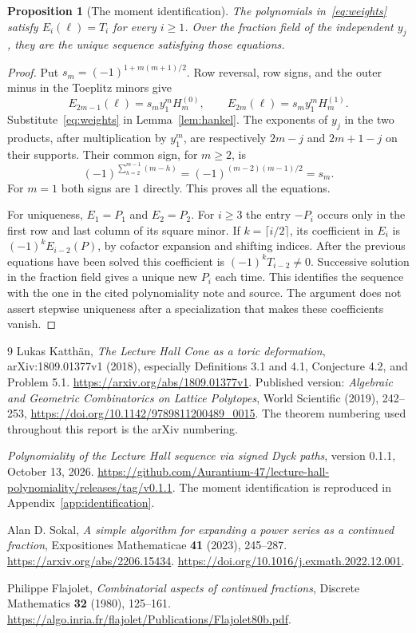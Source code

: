 \documentclass[11pt]{article}
\newtheorem{proposition}[theorem]{Proposition}
\theoremstyle{definition}
\theoremstyle{remark}
\begin{document}
\begin{proposition}[The moment identification]\label{prop:identification}
The polynomials in~\eqref{eq:weights} satisfy $E_i(\ell)=T_i$ for every
$i\ge1$. Over the fraction field of the independent $y_j$, they are the
unique sequence satisfying those equations.
\end{proposition}
\begin{proof}
Put $s_m=(-1)^{1+m(m+1)/2}$. Row reversal, row signs, and the outer minus
in the Toeplitz minors give
\[
 E_{2m-1}(\ell)=s_m y_1^mH_m^{(0)},\qquad
 E_{2m}(\ell)=s_m y_1^mH_m^{(1)}.
\]
Substitute~\eqref{eq:weights} in Lemma~\ref{lem:hankel}.
The exponents of $y_j$ in the two products, after multiplication by $y_1^m$,
are respectively $2m-j$ and $2m+1-j$ on their supports. Their common sign,
for $m\ge2$, is
\[
 (-1)^{\sum_{h=2}^{m-1}(m-h)}
 =(-1)^{(m-2)(m-1)/2}=s_m.
\]
For $m=1$ both signs are $1$ directly. This proves all the equations.

For uniqueness, $E_1=P_1$ and $E_2=P_2$. For $i\ge3$ the entry $-P_i$
occurs only in the first row and last column of its square minor. If
$k=\lceil i/2\rceil$, its coefficient in $E_i$ is
$(-1)^kE_{i-2}(P)$, by cofactor expansion and shifting indices.
After the previous equations have been solved this coefficient is
$(-1)^kT_{i-2}\ne0$. Successive solution in the fraction field gives a
unique new $P_i$ each time. This identifies the sequence with the one in
the cited polynomiality note and source. The argument does not assert stepwise uniqueness
after a specialization that makes these coefficients vanish.
\end{proof}

\begin{thebibliography}{9}
Lukas Katth\"an,
\emph{The Lecture Hall Cone as a toric deformation},
arXiv:1809.01377v1 (2018), especially Definitions 3.1 and 4.1,
Conjecture 4.2, and Problem 5.1.
\url{https://arxiv.org/abs/1809.01377v1}.
Published version: \emph{Algebraic and Geometric Combinatorics on Lattice
Polytopes}, World Scientific (2019), 242--253,
\url{https://doi.org/10.1142/9789811200489_0015}.
The theorem numbering used throughout this report is the arXiv numbering.

\emph{Polynomiality of the Lecture Hall sequence via signed Dyck paths},
version 0.1.1, October 13, 2026.
\url{https://github.com/Aurantium-47/lecture-hall-polynomiality/releases/tag/v0.1.1}.
The moment identification is reproduced in Appendix~\ref{app:identification}.

Alan D. Sokal,
\emph{A simple algorithm for expanding a power series as a continued fraction},
Expositiones Mathematicae \textbf{41} (2023), 245--287.
\url{https://arxiv.org/abs/2206.15434}.
\url{https://doi.org/10.1016/j.exmath.2022.12.001}.

Philippe Flajolet,
\emph{Combinatorial aspects of continued fractions},
Discrete Mathematics \textbf{32} (1980), 125--161.
\url{https://algo.inria.fr/flajolet/Publications/Flajolet80b.pdf}.
\end{thebibliography}
\end{document}
